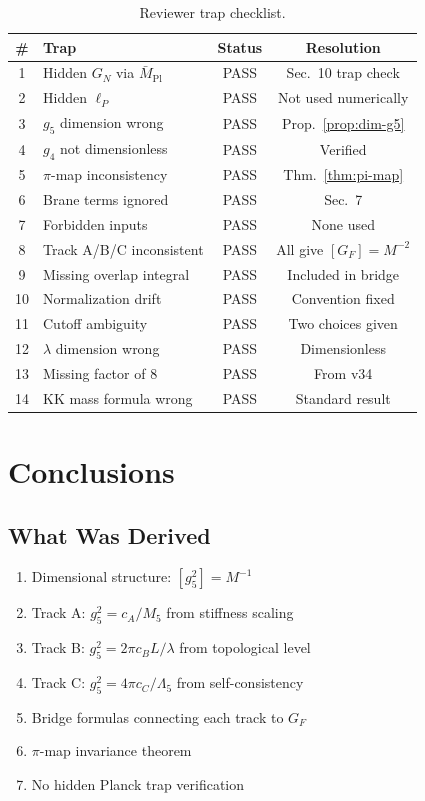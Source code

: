 \documentclass[11pt,a4paper]{article}
\begin{document}
\begin{table}[h]
\centering
\begin{tabular}{clcc}
\toprule
\# & Trap & Status & Resolution \\
\midrule
1 & Hidden $G_N$ via $\bar{M}_{\text{Pl}}$ & PASS & Sec.~10 trap check \\
2 & Hidden $\ell_P$ & PASS & Not used numerically \\
3 & $g_5$ dimension wrong & PASS & Prop.~\ref{prop:dim-g5} \\
4 & $g_4$ not dimensionless & PASS & Verified \\
5 & $\pi$-map inconsistency & PASS & Thm.~\ref{thm:pi-map} \\
6 & Brane terms ignored & PASS & Sec.~7 \\
7 & Forbidden inputs & PASS & None used \\
8 & Track A/B/C inconsistent & PASS & All give $[G_F] = M^{-2}$ \\
9 & Missing overlap integral & PASS & Included in bridge \\
10 & Normalization drift & PASS & Convention fixed \\
11 & Cutoff ambiguity & PASS & Two choices given \\
12 & $\lambda$ dimension wrong & PASS & Dimensionless \\
13 & Missing factor of 8 & PASS & From v34 \\
14 & KK mass formula wrong & PASS & Standard result \\
\bottomrule
\end{tabular}
\caption{Reviewer trap checklist.}
\label{tab:traps}
\end{table}

\section{Conclusions}

\subsection{What Was Derived}

\begin{enumerate}
    \item Dimensional structure: $[g_5^2] = M^{-1}$
    \item Track A: $g_5^2 = c_A/M_5$ from stiffness scaling
    \item Track B: $g_5^2 = 2\pi c_B L/\lambda$ from topological level
    \item Track C: $g_5^2 = 4\pi c_C/\Lambda_5$ from self-consistency
    \item Bridge formulas connecting each track to $G_F$
    \item $\pi$-map invariance theorem
    \item No hidden Planck trap verification
\end{enumerate}
\end{document}
